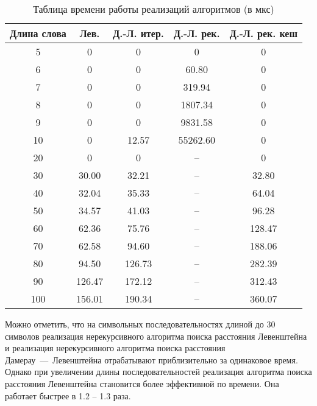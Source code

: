 \begin{table} [h!]
	\caption{Таблица времени работы реализаций алгоритмов (в мкс)}
	\begin{center}
		\begin{tabular}{|c c c c c|}
			\hline
			Длина слова & Лев. & Д.-Л. итер. & Д.-Л. рек. & Д.-Л. рек. кеш  \\ [0.5ex]
			\hline
			5 & 0 & 0 & 0 & 0\\
			\hline
			6 & 0 & 0 & 60.80 & 0\\
			\hline
			7 & 0 & 0 & 319.94 & 0\\
			\hline
			8 & 0 & 0 & 1807.34 & 0\\
			\hline
			9 & 0 & 0 & 9831.58 & 0\\
			\hline
			10 & 0 & 12.57 & 55262.60 & 0\\
			\hline 
			20 & 0 & 0 & -- & 0\\
			\hline
			30 & 30.00 & 32.21 & -- & 32.80\\
			\hline
			40 & 32.04 & 35.33 & -- & 64.04\\
			\hline
			50 & 34.57 & 41.03 & -- & 96.28\\
			\hline
			60 & 62.36 & 75.76 & -- & 128.47\\
			\hline
			70 & 62.58 & 94.60 & -- & 188.06\\
			\hline 
			80 & 94.50 & 126.73 & -- & 282.39\\
			\hline
			90 & 126.47 & 172.12 & -- & 312.43\\
			\hline
			100 & 156.01 & 190.34 & -- & 360.07\\
			\hline
		\end{tabular}
	\end{center}
\end{table}



\clearpage


Можно отметить, что на символьных последовательностях длиной до 30 символов реализация нерекурсивного алгоритма поиска расстояния Левенштейна и реализация нерекурсивного алгоритма поиска расстояния Дамерау~---~Левенштейна отрабатывают приблизительно за одинаковое время. Однако при увеличении длины последовательностей реализация алгоритма поиска расстояния Левенштейна становится более эффективной по времени. Она работает быстрее в 1.2 -- 1.3 раза.

